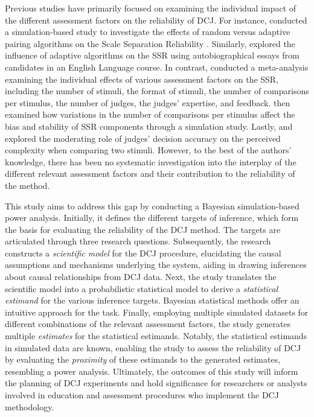 \documentclass[
  authoryear,
  preprint,
  1p]{elsarticle}
\begin{document}
Previous studies have primarily focused on examining the individual
impact of the different assessment factors on the reliability of DCJ.
For instance, \citet{Bramley_2015} conducted a simulation-based study to
investigate the effects of random versus adaptive pairing algorithms on
the Scale Separation Reliability \citep[SSR,][]{Pollitt_2012b}.
Similarly, \citet{Bramley_et_al_2019} explored the influence of adaptive
algorithms on the SSR using autobiographical essays from candidates in
an English Language course. In contrast, \citet{Verhavert_et_al_2019}
conducted a meta-analysis examining the individual effects of various
assessment factors on the SSR, including the number of stimuli, the
format of stimuli, the number of comparisons per stimulus, the number of
judges, the judges' expertise, and feedback.
\citet{Crompvoets_et_al_2022} then examined how variations in the number
of comparisons per stimulus affect the bias and stability of SSR
components through a simulation study. Lastly,
\citet{vanDaal_et_al_2017} and \citet{Gijsen_et_al_2021} explored the
moderating role of judges' decision accuracy on the perceived complexity
when comparing two stimuli. However, to the best of the authors'
knowledge, there has been no systematic investigation into the interplay
of the different relevant assessment factors and their contribution to
the reliability of the method.

This study aims to address this gap by conducting a Bayesian
simulation-based power analysis. Initially, it defines the different
targets of inference, which form the basis for evaluating the
reliability of the DCJ method. The targets are articulated through three
research questions. Subsequently, the research constructs a
\emph{scientific model} for the DCJ procedure, elucidating the causal
assumptions and mechanisms underlying the system, aiding in drawing
inferences about causal relationships from DCJ data. Next, the study
translates the scientific model into a probabilistic statistical model
to derive a \emph{statistical estimand} for the various inference
targets. Bayesian statistical methods offer an intuitive approach for
the task. Finally, employing multiple simulated datasets for different
combinations of the relevant assessment factors, the study generates
multiple \emph{estimates} for the statistical estimands. Notably, the
statistical estimands in simulated data are known, enabling the study to
assess the reliability of DCJ by evaluating the \emph{proximity} of
these estimands to the generated estimates, resembling a power analysis.
Ultimately, the outcomes of this study will inform the planning of DCJ
experiments and hold significance for researchers or analysts involved
in education and assessment procedures who implement the DCJ
methodology.
\end{document}
